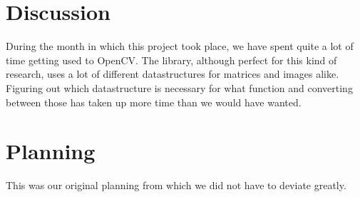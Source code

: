 \documentclass[a4paper]{article}
\begin{document}
\section{Discussion}
During the month in which this project took place, we have spent quite a lot of
time getting used to OpenCV. The library, although perfect for this kind of
research, uses a lot of different datastructures for matrices and images alike.
Figuring out which datastructure is necessary for what function and converting
between those has taken up more time than we would have wanted.

\newpage

\section{Planning}
This was our original planning from which we did not have to deviate greatly.
\end{document}
